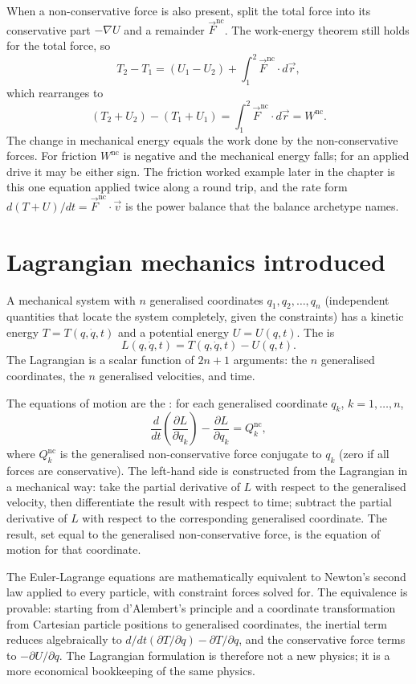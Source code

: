 

When a non-conservative force is also present, split the total force into
its conservative part $-\nabla U$ and a remainder $\vec{F}^{\text{nc}}$.
The work-energy theorem still holds for the total force, so
\[
T_2 - T_1 = (U_1 - U_2) + \int_1^2 \vec{F}^{\text{nc}}\cdot d\vec{r},
\]
which rearranges to
\[
(T_2 + U_2) - (T_1 + U_1) = \int_1^2 \vec{F}^{\text{nc}}\cdot d\vec{r}
= W^{\text{nc}}.
\]
The change in mechanical energy equals the work done by the
non-conservative forces. For friction $W^{\text{nc}}$ is negative and
the mechanical energy falls; for an applied drive it may be either sign.
The friction worked example later in the chapter is this one equation
applied twice along a round trip, and the rate form $d(T+U)/dt =
\vec{F}^{\text{nc}}\cdot\vec{v}$ is the power balance that the balance
archetype names.

\section{Lagrangian mechanics introduced}

A mechanical system with $n$ generalised coordinates $q_1, q_2, \ldots,
q_n$ (independent quantities that locate the system completely, given
the constraints) has a kinetic energy $T = T(q, \dot{q}, t)$ and a
potential energy $U = U(q, t)$. The  is
\[
L(q, \dot{q}, t) = T(q, \dot{q}, t) - U(q, t).
\]
The Lagrangian is a scalar function of $2n + 1$ arguments: the $n$
generalised coordinates, the $n$ generalised velocities, and time.

The equations of motion are the :
for each generalised coordinate $q_k$, $k = 1, \ldots, n$,
\[
\frac{d}{dt}\left(\frac{\partial L}{\partial \dot{q}_k}\right) -
\frac{\partial L}{\partial q_k} = Q_k^{\text{nc}},
\]
where $Q_k^{\text{nc}}$ is the generalised non-conservative force
conjugate to $q_k$ (zero if all forces are conservative). The
left-hand side is constructed from the Lagrangian in a mechanical way:
take the partial derivative of $L$ with respect to the generalised
velocity, then differentiate the result with respect to time; subtract
the partial derivative of $L$ with respect to the corresponding
generalised coordinate. The result, set equal to the generalised
non-conservative force, is the equation of motion for that coordinate.

The Euler-Lagrange equations are mathematically equivalent to
Newton's second law applied to every particle, with constraint forces
solved for. The equivalence is provable: starting from d'Alembert's
principle and a coordinate transformation from Cartesian particle
positions to generalised coordinates, the inertial term reduces
algebraically to $d/dt(\partial T/\partial \dot{q}) - \partial T/
\partial q$, and the conservative force terms to $-\partial U/\partial
q$. The Lagrangian formulation is therefore not a new physics; it is
a more economical bookkeeping of the same physics.

